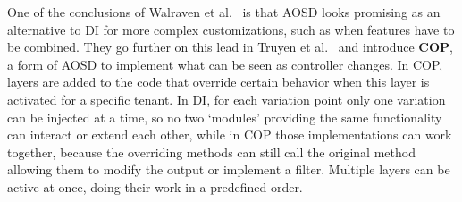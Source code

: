One of the conclusions of Walraven et al.~\cite{walraven2011middleware} is that \ac{AOSD} looks promising as an alternative to \ac{DI} for more complex customizations, such as when features have to be combined.
They go further on this lead in Truyen et al.~\cite{truyen2012context} and introduce \textbf{\ac{COP}}, a form of \ac{AOSD} to implement what can be seen as controller changes. 
In \ac{COP}, layers are added to the code that override certain behavior when this layer is activated for a specific tenant. 
In \ac{DI}, for each variation point only one variation can be injected at a time, so no two `modules' providing the same functionality can interact or extend each other, while in \ac{COP} those implementations can work together, because the overriding methods can still call the original method allowing them to modify the output or implement a filter. 
Multiple layers can be active at once, doing their work in a predefined order.

